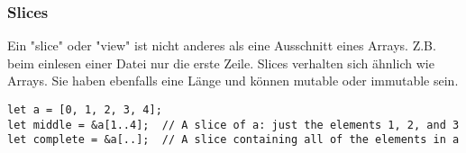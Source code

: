 \subsubsection{Slices}
Ein "slice" oder "view" ist nicht anderes als eine Ausschnitt eines Arrays. Z.B. beim einlesen einer Datei nur die erste Zeile.
Slices verhalten sich ähnlich wie Arrays. Sie haben ebenfalls eine Länge und können mutable oder immutable sein.

\begin{lstlisting}
let a = [0, 1, 2, 3, 4];
let middle = &a[1..4]; 	// A slice of a: just the elements 1, 2, and 3
let complete = &a[..]; 	// A slice containing all of the elements in a
\end{lstlisting}